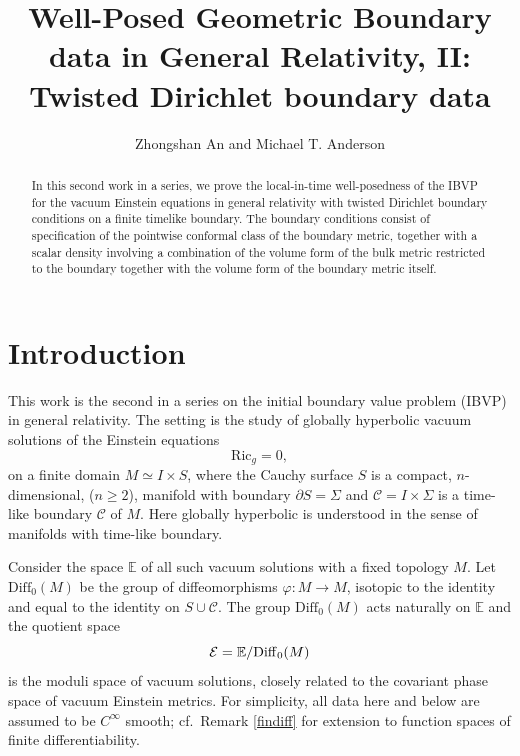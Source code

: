 \documentclass[10pt]{amsart}
\newcommand{\f}{\varphi}
\newcommand{\Si}{\Sigma}
\newcommand{\cC}{{\mathcal C}}
\newcommand{\cE}{{\mathcal E}}
\newcommand{\bE}{\mathbb E}
\newcommand{\Diff}{\mathrm{Diff}}
\newcommand{\Ric}{\mathrm{Ric}}
\newcommand{\be}{\begin{equation}}
\newcommand{\ee}{\end{equation}}
\newcommand{\p}{\partial}
\renewcommand{\to}{\rightarrow}
\newcommand{\<}{\langle}
\renewcommand{\>}{\rangle}
\theoremstyle{plain}
\theoremstyle{remark}
\theoremstyle{definition}
\numberwithin{equation}{section}
\begin{document}
\title[ ]{Well-Posed Geometric Boundary data in General Relativity, II: Twisted Dirichlet boundary data} 

\author{Zhongshan An and Michael T. Anderson}

\address{Institute of Geometry and Physics, 
University of Science and Technology of China,
No. 99 Xiupu Road, Shanghai, China, 201305}

\address{Department of Mathematics, 
Stony Brook University,
Stony Brook, NY 11794}

\begin{abstract} 
In this second work in a series, we prove the local-in-time well-posedness of the IBVP for the vacuum Einstein equations in general 
relativity with twisted Dirichlet boundary conditions on a finite timelike boundary. The boundary conditions consist of specification of the 
pointwise conformal class of the boundary metric, together with a scalar density involving a combination of the volume form of the bulk metric 
restricted to the boundary together with the volume form of the boundary metric itself. 
\end{abstract}


\maketitle 

\section{Introduction}

  This work is the second in a series on the initial boundary value problem (IBVP) in general relativity. The setting is the study of globally hyperbolic vacuum 
solutions of the Einstein equations 
\be \label{vacuum}
\Ric_g = 0,
\ee
on a finite domain $M \simeq I\times S$, where the Cauchy surface $S$ is a compact, $n$-dimensional, ($n \geq 2$), manifold with 
boundary $\p S = \Si$ and $\cC = I\times \Si$ is a time-like boundary $\cC$ of $M$. Here globally hyperbolic is understood in the sense of 
manifolds with time-like boundary. 

  Consider the space $\bE$ of all such vacuum solutions with a fixed topology $M$. Let $\Diff_0(M)$ 
be the group of diffeomorphisms $\f: M \to M$, isotopic to the identity and equal to the identity on $S \cup \cC$. The group $\Diff_0(M)$ acts naturally on 
$\bE$ and the quotient space 
\be \label{cE}
\cE = \bE/{\rm Diff}_0(M)
\ee
is the moduli space of vacuum solutions, closely related to the covariant phase space of vacuum Einstein metrics. For simplicity, all data here and 
below are assumed to be $C^{\infty}$ smooth; cf.~Remark \ref{findiff} for extension to function spaces of finite differentiability. 
\end{document}
